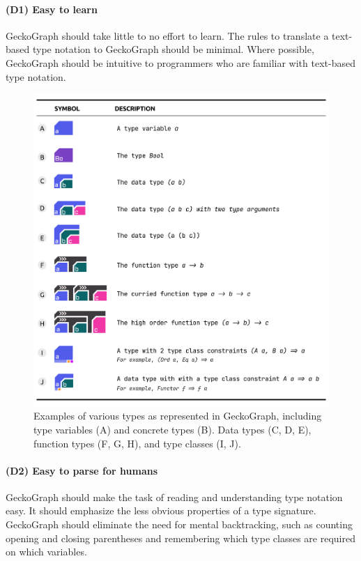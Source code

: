 \documentclass[preprint,12pt]{elsarticle}
\begin{document}
\paragraph{\textbf{(D1) Easy to learn}}\label{goal1} GeckoGraph should take little to no effort to learn. The rules to translate a text-based type notation to GeckoGraph should be minimal. Where possible, GeckoGraph should be intuitive to programmers who are familiar with text-based type notation.

\begin{figure}[!h]
  \includegraphics[width=\linewidth]{figures/Design}
  \caption{
        \label{fig:design}
        Examples of various types as represented in GeckoGraph, including type variables (A) and concrete types (B). Data types (C, D, E), function types (F, G, H), and type classes (I, J).
  }
\end{figure}

\paragraph{\textbf{(D2) Easy to parse for humans}}  \label{goal2} GeckoGraph should make the task of reading and understanding type notation easy. It should emphasize the less obvious properties of a type signature. GeckoGraph should eliminate the need for mental backtracking, such as counting opening and closing parentheses and remembering which type classes are required on which variables. 
\end{document}

